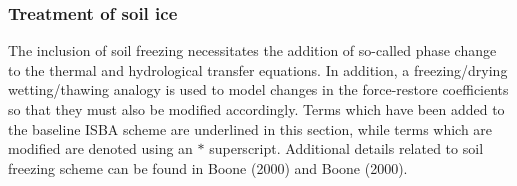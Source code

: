 \subsubsection{Treatment of soil ice}
\label{sec:isba_soil_ice_treatment}

The inclusion of soil freezing necessitates the addition
of so-called phase change to the thermal and hydrological
transfer equations. In addition,
a freezing/drying wetting/thawing analogy is
used to model changes in the force-restore coefficients
so that they must also be modified accordingly. Terms which have been
added to the baseline ISBA scheme are underlined in this
section, while terms which are modified are denoted using
an $\ast$ superscript.
Additional details related to soil freezing scheme 
can be found in Boone \etal (2000) and Boone (2000)\nocite{Boone2000a}.


